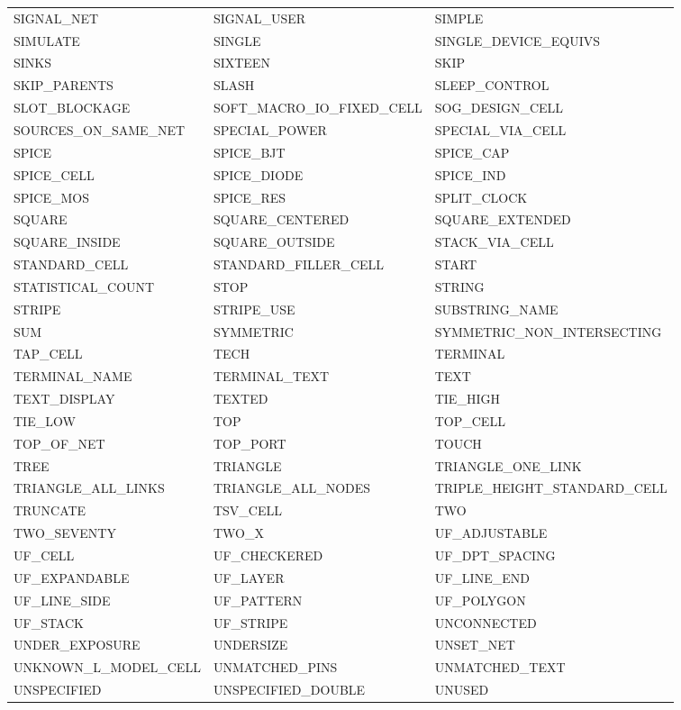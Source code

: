 \begin{longtable}{@{}>{\raggedright\arraybackslash\ttfamily}p{} >{\raggedright\arraybackslash\ttfamily}p{} >{\raggedright\arraybackslash\ttfamily}p{}@{}}
SIGNAL\_NET & SIGNAL\_USER & SIMPLE \\
SIMULATE & SINGLE & SINGLE\_DEVICE\_EQUIVS \\
SINKS & SIXTEEN & SKIP \\
SKIP\_PARENTS & SLASH & SLEEP\_CONTROL \\
SLOT\_BLOCKAGE & SOFT\_MACRO\_IO\_FIXED\_CELL & SOG\_DESIGN\_CELL \\
SOURCES\_ON\_SAME\_NET & SPECIAL\_POWER & SPECIAL\_VIA\_CELL \\
SPICE & SPICE\_BJT & SPICE\_CAP \\
SPICE\_CELL & SPICE\_DIODE & SPICE\_IND \\
SPICE\_MOS & SPICE\_RES & SPLIT\_CLOCK \\
SQUARE & SQUARE\_CENTERED & SQUARE\_EXTENDED \\
SQUARE\_INSIDE & SQUARE\_OUTSIDE & STACK\_VIA\_CELL \\
STANDARD\_CELL & STANDARD\_FILLER\_CELL & START \\
STATISTICAL\_COUNT & STOP & STRING \\
STRIPE & STRIPE\_USE & SUBSTRING\_NAME \\
SUM & SYMMETRIC & SYMMETRIC\_NON\_INTERSECTING \\
TAP\_CELL & TECH & TERMINAL \\
TERMINAL\_NAME & TERMINAL\_TEXT & TEXT \\
TEXT\_DISPLAY & TEXTED & TIE\_HIGH \\
TIE\_LOW & TOP & TOP\_CELL \\
TOP\_OF\_NET & TOP\_PORT & TOUCH \\
TREE & TRIANGLE & TRIANGLE\_ONE\_LINK \\
TRIANGLE\_ALL\_LINKS & TRIANGLE\_ALL\_NODES & TRIPLE\_HEIGHT\_STANDARD\_CELL \\
TRUNCATE & TSV\_CELL & TWO \\
TWO\_SEVENTY & TWO\_X & UF\_ADJUSTABLE \\
UF\_CELL & UF\_CHECKERED & UF\_DPT\_SPACING \\
UF\_EXPANDABLE & UF\_LAYER & UF\_LINE\_END \\
UF\_LINE\_SIDE & UF\_PATTERN & UF\_POLYGON \\
UF\_STACK & UF\_STRIPE & UNCONNECTED \\
UNDER\_EXPOSURE & UNDERSIZE & UNSET\_NET \\
UNKNOWN\_L\_MODEL\_CELL & UNMATCHED\_PINS & UNMATCHED\_TEXT \\
UNSPECIFIED & UNSPECIFIED\_DOUBLE & UNUSED \\

\end{longtable}
